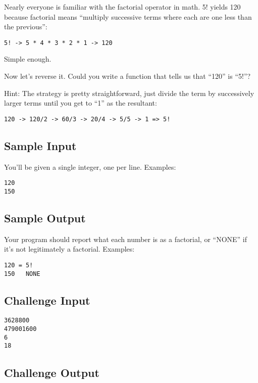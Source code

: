 Nearly everyone is familiar with the factorial operator in math. 5!
yields 120 because factorial means ``multiply successive terms where
each are one less than the previous'':

\begin{verbatim}
5! -> 5 * 4 * 3 * 2 * 1 -> 120
\end{verbatim}

Simple enough.

Now let's reverse it. Could you write a function that tells us that
``120'' is ``5!''?

Hint: The strategy is pretty straightforward, just divide the term by
successively larger terms until you get to ``1'' as the resultant:

\begin{verbatim}
120 -> 120/2 -> 60/3 -> 20/4 -> 5/5 -> 1 => 5!
\end{verbatim}

\subsection{Sample Input}\label{sample-input-3}

You'll be given a single integer, one per line. Examples:

\begin{verbatim}
120
150
\end{verbatim}

\subsection{Sample Output}\label{sample-output-3}

Your program should report what each number is as a factorial, or
``NONE'' if it's not legitimately a factorial. Examples:

\begin{verbatim}
120 = 5!
150   NONE
\end{verbatim}

\subsection{Challenge Input}\label{challenge-input-31}

\begin{verbatim}
3628800
479001600
6
18
\end{verbatim}

\subsection{Challenge Output}\label{challenge-output-26}


